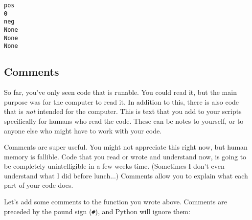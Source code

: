 \documentclass[11pt]{article}
\begin{document}
    \begin{Verbatim}[commandchars=\\\{\}]
pos
0
neg
None
None
None

    \end{Verbatim}

    \subsection{Comments}\label{comments}

So far, you've only seen code that is runable. You could read it, but
the main purpose was for the computer to read it. In addition to this,
there is also code that is \emph{not} intended for the computer. This is
text that you add to your scripts specifically for humans who read the
code. These can be notes to yourself, or to anyone else who might have
to work with your code.

Comments are super useful. You might not appreciate this right now, but
human memory is fallible. Code that you read or wrote and understand
now, is going to be completely unintelligible in a few weeks time.
(Sometimes I don't even understand what I did before lunch...) Comments
allow you to explain what each part of your code does.

Let's add some comments to the function you wrote above. Comments are
preceded by the pound sign (\texttt{\#}), and Python will ignore them:
\end{document}

